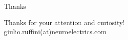 \begin{frame}[label=ladila]{Thanks}
\vfill
\begin{center}
    Thanks for your attention and curiosity!  \\
    
    giulio.ruffini(at)neuroelectrics.com

\end{center}
\vfill

\end{frame}
